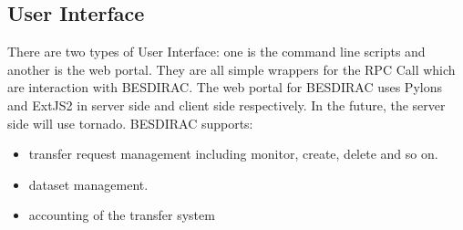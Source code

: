 \subsection{User Interface}
There are two types of User Interface: one is the command line scripts and 
another is the web portal. 
They are all simple wrappers for the RPC Call which are interaction
with BESDIRAC.
The web portal for BESDIRAC uses Pylons and ExtJS2 in server side and
client side respectively. In the future, the server side will use 
tornado. 
BESDIRAC supports:
\begin{itemize}
    \item transfer request management including monitor, create, delete
          and so on.
    \item dataset management.
    \item accounting of the transfer system
\end{itemize}
